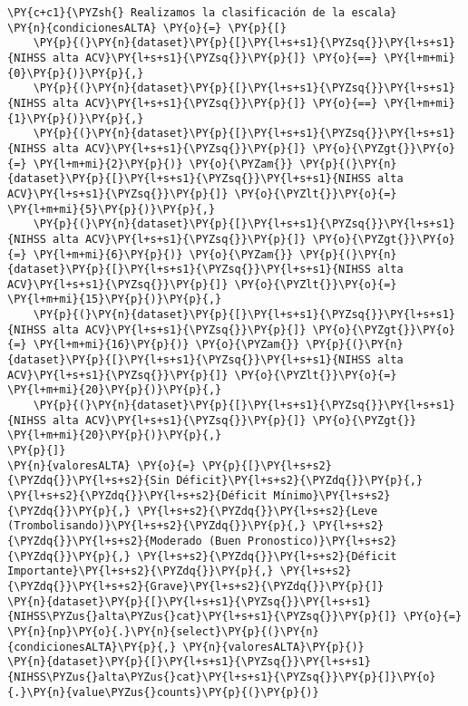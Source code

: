     \begin{tcolorbox}[breakable, size=fbox, boxrule=1pt, pad at break*=1mm,colback=cellbackground, colframe=cellborder]
\begin{Verbatim}[commandchars=\\\{\}]
\PY{c+c1}{\PYZsh{} Realizamos la clasificación de la escala}
\PY{n}{condicionesALTA} \PY{o}{=} \PY{p}{[}
    \PY{p}{(}\PY{n}{dataset}\PY{p}{[}\PY{l+s+s1}{\PYZsq{}}\PY{l+s+s1}{NIHSS alta ACV}\PY{l+s+s1}{\PYZsq{}}\PY{p}{]} \PY{o}{==} \PY{l+m+mi}{0}\PY{p}{)}\PY{p}{,}
    \PY{p}{(}\PY{n}{dataset}\PY{p}{[}\PY{l+s+s1}{\PYZsq{}}\PY{l+s+s1}{NIHSS alta ACV}\PY{l+s+s1}{\PYZsq{}}\PY{p}{]} \PY{o}{==} \PY{l+m+mi}{1}\PY{p}{)}\PY{p}{,}
    \PY{p}{(}\PY{n}{dataset}\PY{p}{[}\PY{l+s+s1}{\PYZsq{}}\PY{l+s+s1}{NIHSS alta ACV}\PY{l+s+s1}{\PYZsq{}}\PY{p}{]} \PY{o}{\PYZgt{}}\PY{o}{=} \PY{l+m+mi}{2}\PY{p}{)} \PY{o}{\PYZam{}} \PY{p}{(}\PY{n}{dataset}\PY{p}{[}\PY{l+s+s1}{\PYZsq{}}\PY{l+s+s1}{NIHSS alta ACV}\PY{l+s+s1}{\PYZsq{}}\PY{p}{]} \PY{o}{\PYZlt{}}\PY{o}{=} \PY{l+m+mi}{5}\PY{p}{)}\PY{p}{,}
    \PY{p}{(}\PY{n}{dataset}\PY{p}{[}\PY{l+s+s1}{\PYZsq{}}\PY{l+s+s1}{NIHSS alta ACV}\PY{l+s+s1}{\PYZsq{}}\PY{p}{]} \PY{o}{\PYZgt{}}\PY{o}{=} \PY{l+m+mi}{6}\PY{p}{)} \PY{o}{\PYZam{}} \PY{p}{(}\PY{n}{dataset}\PY{p}{[}\PY{l+s+s1}{\PYZsq{}}\PY{l+s+s1}{NIHSS alta ACV}\PY{l+s+s1}{\PYZsq{}}\PY{p}{]} \PY{o}{\PYZlt{}}\PY{o}{=} \PY{l+m+mi}{15}\PY{p}{)}\PY{p}{,}
    \PY{p}{(}\PY{n}{dataset}\PY{p}{[}\PY{l+s+s1}{\PYZsq{}}\PY{l+s+s1}{NIHSS alta ACV}\PY{l+s+s1}{\PYZsq{}}\PY{p}{]} \PY{o}{\PYZgt{}}\PY{o}{=} \PY{l+m+mi}{16}\PY{p}{)} \PY{o}{\PYZam{}} \PY{p}{(}\PY{n}{dataset}\PY{p}{[}\PY{l+s+s1}{\PYZsq{}}\PY{l+s+s1}{NIHSS alta ACV}\PY{l+s+s1}{\PYZsq{}}\PY{p}{]} \PY{o}{\PYZlt{}}\PY{o}{=} \PY{l+m+mi}{20}\PY{p}{)}\PY{p}{,}
    \PY{p}{(}\PY{n}{dataset}\PY{p}{[}\PY{l+s+s1}{\PYZsq{}}\PY{l+s+s1}{NIHSS alta ACV}\PY{l+s+s1}{\PYZsq{}}\PY{p}{]} \PY{o}{\PYZgt{}} \PY{l+m+mi}{20}\PY{p}{)}\PY{p}{,}
\PY{p}{]}
\PY{n}{valoresALTA} \PY{o}{=} \PY{p}{[}\PY{l+s+s2}{\PYZdq{}}\PY{l+s+s2}{Sin Déficit}\PY{l+s+s2}{\PYZdq{}}\PY{p}{,} \PY{l+s+s2}{\PYZdq{}}\PY{l+s+s2}{Déficit Mínimo}\PY{l+s+s2}{\PYZdq{}}\PY{p}{,} \PY{l+s+s2}{\PYZdq{}}\PY{l+s+s2}{Leve (Trombolisando)}\PY{l+s+s2}{\PYZdq{}}\PY{p}{,} \PY{l+s+s2}{\PYZdq{}}\PY{l+s+s2}{Moderado (Buen Pronostico)}\PY{l+s+s2}{\PYZdq{}}\PY{p}{,} \PY{l+s+s2}{\PYZdq{}}\PY{l+s+s2}{Déficit Importante}\PY{l+s+s2}{\PYZdq{}}\PY{p}{,} \PY{l+s+s2}{\PYZdq{}}\PY{l+s+s2}{Grave}\PY{l+s+s2}{\PYZdq{}}\PY{p}{]}
\PY{n}{dataset}\PY{p}{[}\PY{l+s+s1}{\PYZsq{}}\PY{l+s+s1}{NIHSS\PYZus{}alta\PYZus{}cat}\PY{l+s+s1}{\PYZsq{}}\PY{p}{]} \PY{o}{=} \PY{n}{np}\PY{o}{.}\PY{n}{select}\PY{p}{(}\PY{n}{condicionesALTA}\PY{p}{,} \PY{n}{valoresALTA}\PY{p}{)}
\PY{n}{dataset}\PY{p}{[}\PY{l+s+s1}{\PYZsq{}}\PY{l+s+s1}{NIHSS\PYZus{}alta\PYZus{}cat}\PY{l+s+s1}{\PYZsq{}}\PY{p}{]}\PY{o}{.}\PY{n}{value\PYZus{}counts}\PY{p}{(}\PY{p}{)}
\end{Verbatim}
\end{tcolorbox}


